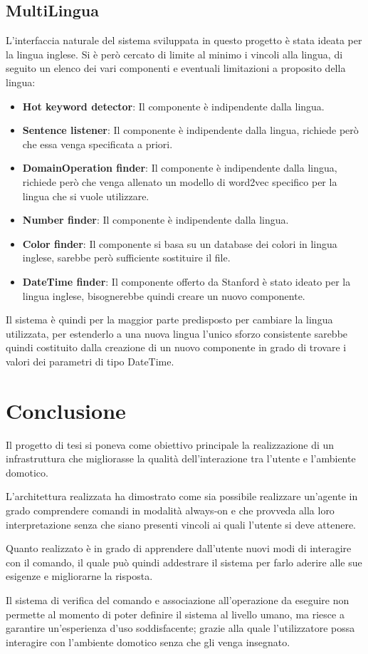 \documentclass[twoside]{supsistudent}
\begin{document}
\section{MultiLingua}
L'interfaccia naturale del sistema sviluppata in questo progetto è stata ideata per la lingua inglese. Si è però cercato di limite al minimo i vincoli alla lingua, di seguito un elenco dei vari componenti e eventuali limitazioni a proposito della lingua:
\begin{itemize}
      \item \textbf{Hot keyword detector}: Il componente è indipendente dalla lingua.
      \item \textbf{Sentence listener}: Il componente è indipendente dalla lingua, richiede però che essa venga specificata a priori.
      \item \textbf{DomainOperation finder}: Il componente è indipendente dalla lingua, richiede però che venga allenato un modello di word2vec specifico per la lingua che si vuole utilizzare.
      \item \textbf{Number finder}: Il componente è indipendente dalla lingua.
      \item \textbf{Color finder}: Il componente si basa su un database dei colori in lingua inglese, sarebbe però sufficiente sostituire il file.
      \item \textbf{DateTime finder}: Il componente offerto da Stanford è stato ideato per la lingua inglese, bisognerebbe quindi creare un nuovo componente.
\end{itemize}
Il sistema è quindi per la maggior parte predisposto per cambiare la lingua utilizzata, per estenderlo a una nuova lingua l'unico sforzo consistente sarebbe quindi costituito dalla creazione di un nuovo componente in grado di trovare i valori dei parametri di tipo DateTime.
\chapter{Conclusione}
Il progetto di tesi si poneva come obiettivo principale la realizzazione di un infrastruttura che migliorasse la qualità dell'interazione tra l'utente e l'ambiente domotico.

L'architettura realizzata ha dimostrato come sia possibile realizzare un'agente in grado comprendere comandi in modalità always-on e che provveda alla loro interpretazione senza che siano presenti vincoli ai quali l'utente si deve attenere.

Quanto realizzato è in grado di apprendere dall'utente nuovi modi di interagire con il comando, il quale può quindi addestrare il sistema per farlo aderire alle sue esigenze e migliorarne la risposta.

Il sistema di verifica del comando e associazione all'operazione da eseguire non permette al momento di poter definire il sistema al livello umano, ma riesce a garantire un'esperienza d'uso soddisfacente; grazie alla quale l'utilizzatore possa interagire con l'ambiente domotico senza che gli venga insegnato.





\end{document}
